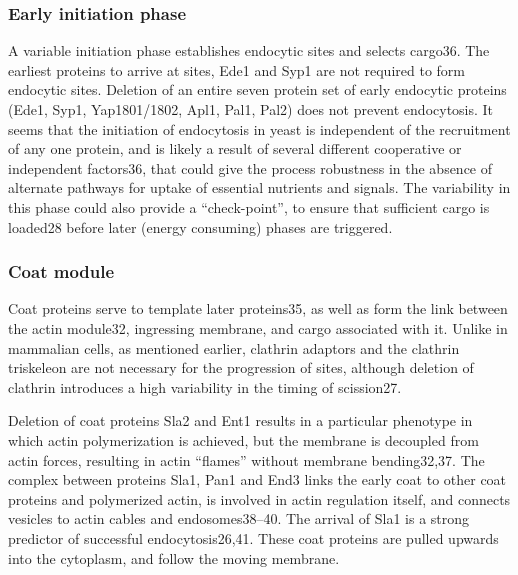  


			\subsubsection{Early initiation phase}
			A variable initiation phase establishes endocytic sites and selects cargo36. The earliest proteins to arrive at sites, Ede1 and Syp1 are not required to form endocytic sites. Deletion of an entire seven protein set of early endocytic proteins (Ede1, Syp1, Yap1801/1802, Apl1, Pal1, Pal2) does not prevent endocytosis. It seems that the initiation of endocytosis in yeast is independent of the recruitment of any one protein, and is likely a result of several different cooperative or independent factors36, that could give the process robustness in the absence of alternate pathways for uptake of essential nutrients and signals. The variability in this phase could also provide a “check-point”, to ensure that sufficient cargo is loaded28 before later (energy consuming) phases are triggered. 

			
			\subsubsection{Coat module}
			Coat proteins serve to template later proteins35, as well as form the link between the actin module32, ingressing membrane, and cargo associated with it. Unlike in mammalian cells, as mentioned earlier, clathrin adaptors and the clathrin triskeleon are not necessary for the progression of sites, although deletion of clathrin introduces a high variability in the timing of scission27. 
			
			\vspace{5mm}
			Deletion of coat proteins Sla2 and Ent1 results in a particular phenotype in which actin polymerization is achieved, but the membrane is decoupled from actin forces, resulting in actin “flames” without membrane bending32,37. The complex between proteins Sla1, Pan1 and End3 links the early coat to other coat proteins and polymerized actin, is involved in actin regulation itself, and connects vesicles to actin cables and endosomes38–40. The arrival of Sla1 is a strong predictor of successful endocytosis26,41. These coat proteins are pulled upwards into the cytoplasm, and follow the moving membrane.



